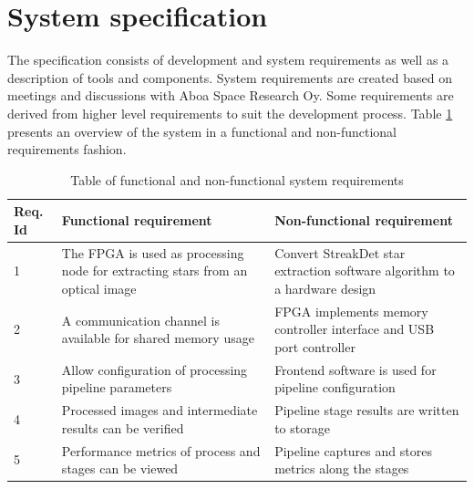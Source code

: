 \documentclass[12pt]{report}
\begin{document}
\section{System specification}

The specification consists of development and system requirements as well as a description of tools and components. System requirements are created based on meetings and discussions with Aboa Space Research Oy. Some requirements are derived from higher level requirements to suit the development process. Table \ref{table:1} presents an overview of the system in a functional and non-functional requirements fashion.

\begin{table}[h]
    \begin{tabular}{|p{1cm}|p{6.15cm}|p{6.15cm}|}
        \hline
        \textbf{Req. Id}& \textbf{Functional requirement}& \textbf{Non-functional requirement}\\
        \hline
        1&The FPGA is used as processing node for extracting stars from an optical image&Convert StreakDet star extraction software algorithm to a hardware design\\
        \hline
        2&A communication channel is available for shared memory usage&FPGA implements memory controller interface and USB port controller\\
        \hline
        3&Allow configuration of processing pipeline parameters&Frontend software is used for pipeline configuration\\
        \hline
        4&Processed images and intermediate results can be verified&Pipeline stage results are written to storage\\
        \hline
        5&Performance metrics of process and stages can be viewed&Pipeline captures and stores metrics along the stages\\
        \hline
    \end{tabular}
    \caption{Table of functional and non-functional system requirements}
    \label{table:1}
\end{table}

\end{document}
